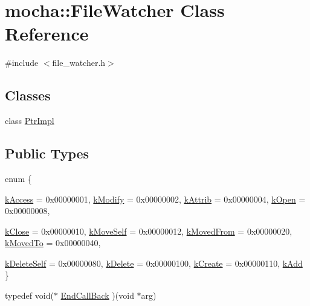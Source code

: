 \hypertarget{classmocha_1_1_file_watcher}{
\section{mocha::FileWatcher Class Reference}
\label{classmocha_1_1_file_watcher}
}


{\ttfamily \#include $<$file\_\-watcher.h$>$}

\subsection*{Classes}
\begin{DoxyCompactItemize}
\item 
class \hyperlink{classmocha_1_1_file_watcher_1_1_ptr_impl}{PtrImpl}
\end{DoxyCompactItemize}
\subsection*{Public Types}
\begin{DoxyCompactItemize}
\item 
enum \{ \par
\hyperlink{classmocha_1_1_file_watcher_ada989fb469049690cb97ad121dea4e9daacab20b4934ef8fd0296328ae0b58f04}{kAccess} =  0x00000001, 
\hyperlink{classmocha_1_1_file_watcher_ada989fb469049690cb97ad121dea4e9da0505213a1f6d1fe29b66f875b885fd01}{kModify} =  0x00000002, 
\hyperlink{classmocha_1_1_file_watcher_ada989fb469049690cb97ad121dea4e9da08857acdd79d2ba149ff150598581051}{kAttrib} =  0x00000004, 
\hyperlink{classmocha_1_1_file_watcher_ada989fb469049690cb97ad121dea4e9da670ab8a86a6cad93c68ec0abcd6c71ca}{kOpen} =  0x00000008, 
\par
\hyperlink{classmocha_1_1_file_watcher_ada989fb469049690cb97ad121dea4e9da95c879ae74b3ead3cc1e88de5f5a031b}{kClose} =  0x00000010, 
\hyperlink{classmocha_1_1_file_watcher_ada989fb469049690cb97ad121dea4e9daa09833e37c008de0c128965ef7e3a8f9}{kMoveSelf} =  0x00000012, 
\hyperlink{classmocha_1_1_file_watcher_ada989fb469049690cb97ad121dea4e9da25b5e3ee7b85e74f45c21a0dd2c24edf}{kMovedFrom} =  0x00000020, 
\hyperlink{classmocha_1_1_file_watcher_ada989fb469049690cb97ad121dea4e9da9f6709a1019d5836374cc86ef5a1ebed}{kMovedTo} =  0x00000040, 
\par
\hyperlink{classmocha_1_1_file_watcher_ada989fb469049690cb97ad121dea4e9da625e550c103b89a767a6b6c167ff96b6}{kDeleteSelf} =  0x00000080, 
\hyperlink{classmocha_1_1_file_watcher_ada989fb469049690cb97ad121dea4e9da1d67f81c57709e0854651d9386891813}{kDelete} =  0x00000100, 
\hyperlink{classmocha_1_1_file_watcher_ada989fb469049690cb97ad121dea4e9da8b3a56082816907ea5a798fe99bcbd5a}{kCreate} =  0x00000110, 
\hyperlink{classmocha_1_1_file_watcher_ada989fb469049690cb97ad121dea4e9dac7d13b67b9a9ba7be3e14e08879535c5}{kAdd}
 \}
\item 
typedef void($\ast$ \hyperlink{classmocha_1_1_file_watcher_af774b8dd436b9f8929506466533831b9}{EndCallBack} )(void $\ast$arg)
\end{DoxyCompactItemize}
